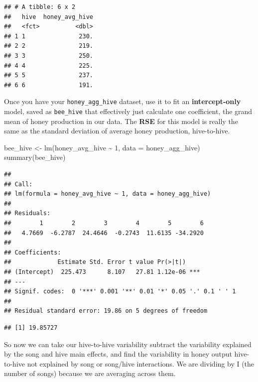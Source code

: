 \documentclass[
  openany]{book}
\newenvironment{Shaded}{\begin{snugshade}}{\end{snugshade}}
\newcommand{\AttributeTok}[1]{\textcolor[rgb]{0.77,0.63,0.00}{#1}}
\newcommand{\CommentTok}[1]{\textcolor[rgb]{0.56,0.35,0.01}{\textit{#1}}}
\newcommand{\DecValTok}[1]{\textcolor[rgb]{0.00,0.00,0.81}{#1}}
\newcommand{\FunctionTok}[1]{\textcolor[rgb]{0.00,0.00,0.00}{#1}}
\newcommand{\NormalTok}[1]{#1}
\newcommand{\OtherTok}[1]{\textcolor[rgb]{0.56,0.35,0.01}{#1}}
\newcommand{\SpecialCharTok}[1]{\textcolor[rgb]{0.00,0.00,0.00}{#1}}
\begin{document}
\begin{verbatim}
## # A tibble: 6 x 2
##   hive  honey_avg_hive
##   <fct>          <dbl>
## 1 1               230.
## 2 2               219.
## 3 3               250.
## 4 4               225.
## 5 5               237.
## 6 6               191.
\end{verbatim}

Once you have your \texttt{honey\_agg\_hive} dataset, use it to fit an \textbf{intercept-only} model, saved as \texttt{bee\_hive} that effectively just calculate one coefficient, the grand mean of honey production in our data. The \textbf{RSE} for this model is really the same as the standard deviation of average honey production, hive-to-hive.

\begin{Shaded}
\begin{Highlighting}[]
\NormalTok{bee\_hive }\OtherTok{\textless{}{-}} \FunctionTok{lm}\NormalTok{(honey\_avg\_hive }\SpecialCharTok{\textasciitilde{}} \DecValTok{1}\NormalTok{, }\AttributeTok{data =}\NormalTok{ honey\_agg\_hive)}
\FunctionTok{summary}\NormalTok{(bee\_hive)}
\end{Highlighting}
\end{Shaded}

\begin{verbatim}
## 
## Call:
## lm(formula = honey_avg_hive ~ 1, data = honey_agg_hive)
## 
## Residuals:
##        1        2        3        4        5        6 
##   4.7669  -6.2787  24.4646  -0.2743  11.6135 -34.2920 
## 
## Coefficients:
##             Estimate Std. Error t value Pr(>|t|)    
## (Intercept)  225.473      8.107   27.81 1.12e-06 ***
## ---
## Signif. codes:  0 '***' 0.001 '**' 0.01 '*' 0.05 '.' 0.1 ' ' 1
## 
## Residual standard error: 19.86 on 5 degrees of freedom
\end{verbatim}

\begin{Shaded}
\end{Shaded}

\begin{verbatim}
## [1] 19.85727
\end{verbatim}

So now we can take our hive-to-hive variability subtract the variability explained by the song and hive main effects, and find the variability in honey output hive-to-hive not explained by song or song/hive interactions. We are dividing by I (the number of songs) because we are averaging across them.
\end{document}
